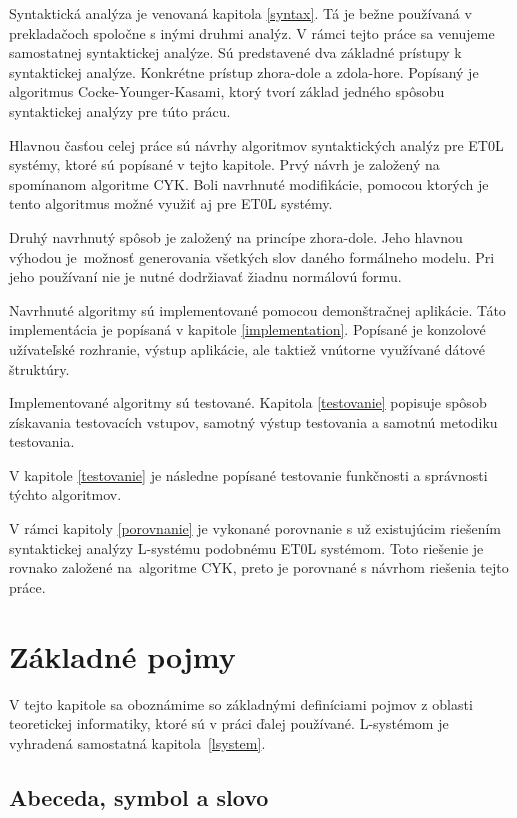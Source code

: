 Syntaktická analýza je venovaná kapitola \ref{syntax}. Tá je bežne používaná v prekladačoch spoločne s inými druhmi analýz. V rámci tejto práce sa venujeme samostatnej syntaktickej analýze. Sú predstavené dva základné prístupy k syntaktickej analýze. Konkrétne prístup zhora-dole a zdola-hore. Popísaný je algoritmus Cocke-Younger-Kasami, ktorý tvorí základ jedného spôsobu syntaktickej analýzy pre túto prácu. 

Hlavnou časťou celej práce sú návrhy algoritmov syntaktických analýz pre ET0L systémy, ktoré sú popísané v tejto kapitole. Prvý návrh je založený na spomínanom algoritme CYK. Boli navrhnuté modifikácie, pomocou ktorých je tento algoritmus možné využiť aj pre ET0L systémy.

Druhý navrhnutý spôsob je založený na princípe zhora-dole. Jeho hlavnou výhodou je~možnosť generovania všetkých slov daného formálneho modelu. Pri jeho používaní nie je nutné dodržiavať žiadnu normálovú formu.

Navrhnuté algoritmy sú implementované pomocou demonštračnej aplikácie. Táto implementácia je popísaná v kapitole \ref{implementation}. Popísané je konzolové užívateľské rozhranie, výstup aplikácie, ale taktiež vnútorne využívané dátové štruktúry.

Implementované algoritmy sú testované. Kapitola \ref{testovanie} popisuje spôsob získavania testovacích vstupov, samotný výstup testovania a samotnú metodiku testovania.

V kapitole \ref{testovanie} je následne popísané testovanie funkčnosti a správnosti týchto algoritmov.

V rámci kapitoly \ref{porovnanie} je vykonané porovnanie s už existujúcim riešením syntaktickej analýzy L-systému podobnému ET0L systémom. Toto riešenie je rovnako založené na~algoritme CYK, preto je porovnané s návrhom riešenia tejto práce. 

\chapter{Základné pojmy}
\label{zaklady}

V tejto kapitole sa oboznámime so základnými definíciami pojmov z oblasti teoretickej informatiky, ktoré sú v práci ďalej používané. L-systémom je vyhradená samostatná kapitola~\ref{lsystem}.

\section{Abeceda, symbol a slovo}

